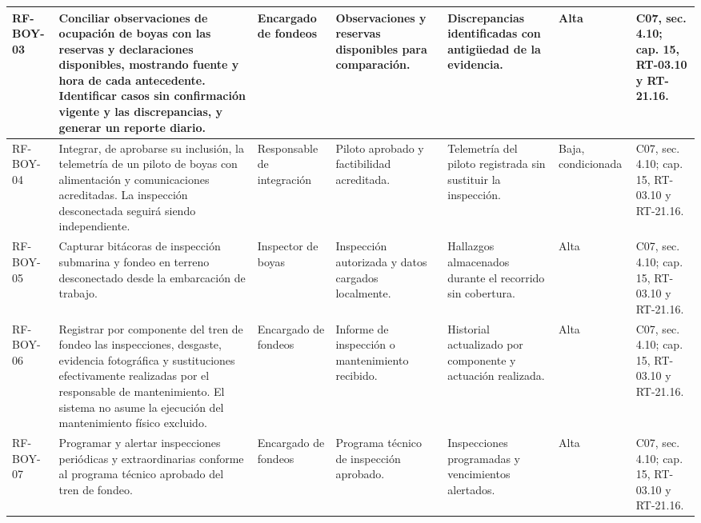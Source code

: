 \begin{longtable}{|L{0.080645\AnchoTablaAnexo}|L{0.262097\AnchoTablaAnexo}|L{0.100806\AnchoTablaAnexo}|L{0.145161\AnchoTablaAnexo}|L{0.173387\AnchoTablaAnexo}|L{0.060484\AnchoTablaAnexo}|L{0.177420\AnchoTablaAnexo}|}
RF-\allowbreak{}BOY-\allowbreak{}03 &
Conciliar observaciones de ocupación de boyas con las reservas y declaraciones disponibles, mostrando fuente y hora de cada antecedente. Identificar casos sin confirmación vigente y las discrepancias, y generar un reporte diario. &
Encargado de fondeos &
Observaciones y reservas disponibles para comparación. &
Discrepancias identificadas con antigüedad de la evidencia. &
Alta &
C07, sec. 4.10; cap. 15, RT-03.10 y RT-21.16. \\ \hline

RF-\allowbreak{}BOY-\allowbreak{}04 &
Integrar, de aprobarse su inclusión, la telemetría de un piloto de boyas con alimentación y comunicaciones acreditadas. La inspección desconectada seguirá siendo independiente. &
Responsable de integración &
Piloto aprobado y factibilidad acreditada. &
Telemetría del piloto registrada sin sustituir la inspección. &
Baja, condicionada &
C07, sec. 4.10; cap. 15, RT-03.10 y RT-21.16. \\ \hline

RF-\allowbreak{}BOY-\allowbreak{}05 &
Capturar bitácoras de inspección submarina y fondeo en terreno desconectado desde la embarcación de trabajo. &
Inspector de boyas &
Inspección autorizada y datos cargados localmente. &
Hallazgos almacenados durante el recorrido sin cobertura. &
Alta &
C07, sec. 4.10; cap. 15, RT-03.10 y RT-21.16. \\ \hline

RF-\allowbreak{}BOY-\allowbreak{}06 &
Registrar por componente del tren de fondeo las inspecciones, desgaste, evidencia fotográfica y sustituciones efectivamente realizadas por el responsable de mantenimiento. El sistema no asume la ejecución del mantenimiento físico excluido. &
Encargado de fondeos &
Informe de inspección o mantenimiento recibido. &
Historial actualizado por componente y actuación realizada. &
Alta &
C07, sec. 4.10; cap. 15, RT-03.10 y RT-21.16. \\ \hline

RF-\allowbreak{}BOY-\allowbreak{}07 &
Programar y alertar inspecciones periódicas y extraordinarias conforme al programa técnico aprobado del tren de fondeo. &
Encargado de fondeos &
Programa técnico de inspección aprobado. &
Inspecciones programadas y vencimientos alertados. &
Alta &
C07, sec. 4.10; cap. 15, RT-03.10 y RT-21.16. \\ \hline

\end{longtable}


